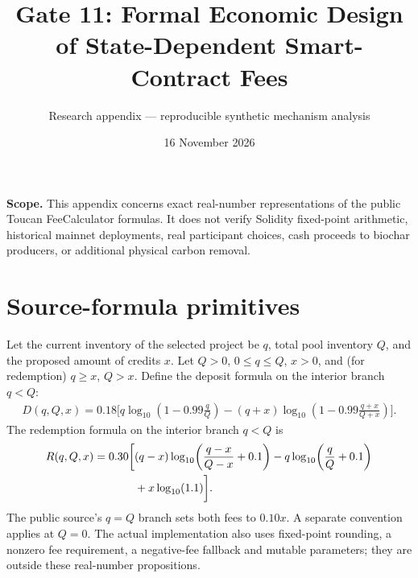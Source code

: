 \documentclass[11pt]{article}
\title{Gate 11: Formal Economic Design of State-Dependent Smart-Contract Fees}
\author{Research appendix --- reproducible synthetic mechanism analysis}
\date{16 November 2026}
\begin{document}
\maketitle
\noindent\textbf{Scope.} This appendix concerns exact real-number representations of the public Toucan FeeCalculator formulas. It does not verify Solidity fixed-point arithmetic, historical mainnet deployments, real participant choices, cash proceeds to biochar producers, or additional physical carbon removal.

\section{Source-formula primitives}
Let the current inventory of the selected project be $q$, total pool inventory $Q$, and the proposed amount of credits $x$. Let $Q>0$, $0\le q\le Q$, $x>0$, and (for redemption) $q\ge x$, $Q>x$. Define the deposit formula on the interior branch $q<Q$:
\begin{align}
D(q,Q,x)=0.18\bigg[q\log_{10}\!\left(1-0.99\frac{q}{Q}\right)
-(q+x)\log_{10}\!\left(1-0.99\frac{q+x}{Q+x}\right)\bigg].\label{eq:deposit}
\end{align}
The redemption formula on the interior branch $q<Q$ is
\begin{align}
R(q,Q,x)=0.30\bigg[&(q-x)\log_{10}\!\left(\frac{q-x}{Q-x}+0.1\right)
-q\log_{10}\!\left(\frac{q}{Q}+0.1\right)\notag\\
&+x\log_{10}(1.1)\bigg].\label{eq:redeem}
\end{align}
The public source's $q=Q$ branch sets both fees to $0.10x$. A separate convention applies at $Q=0$. The actual implementation also uses fixed-point rounding, a nonzero fee requirement, a negative-fee fallback and mutable parameters; they are outside these real-number propositions.
\end{document}
